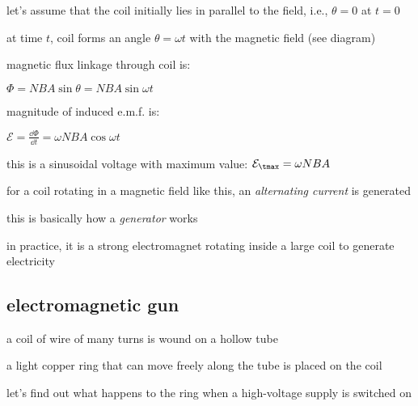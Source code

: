 let's assume that the coil initially lies in parallel to the field, i.e., $\theta=0$ at $t=0$

at time $t$, coil forms an angle $\theta=\omega t$ with the magnetic field (see diagram)

magnetic flux linkage through coil is:

{

\centering

$\Phi = NBA \sin\theta = NBA \sin \omega t$

}

magnitude of induced e.m.f. is: 

{
	
\centering

$\mathcal{E} = \frac{\dd \Phi}{\dd t} = \omega NBA \cos \omega t$

}

this is a sinusoidal voltage with maximum value: $\mathcal{E}_\tmax = \omega NBA$

for a coil rotating in a magnetic field like this, an \emph{alternating current} is generated

this is basically how a \emph{generator} works

in practice, it is a strong electromagnet rotating inside a large coil to generate electricity




\subsection{electromagnetic gun}

a coil of wire of many turns is wound on a hollow tube

a light copper ring that can move freely along the tube is placed on the coil

let's find out what happens to the ring when a high-voltage supply is switched on


